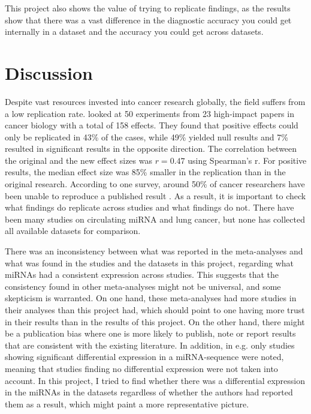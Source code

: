 This project also shows the value of trying to replicate findings, as the results show that there was a vast difference in the diagnostic accuracy you could get internally in a dataset and the accuracy you could get across datasets. 


\section{Discussion}
\label{sec:discussion}

Despite vast resources invested into cancer research globally, the field suffers from a low replication rate. \citet{cancer_replication} looked at 50 experiments from 23 high-impact papers in cancer biology with a total of 158 effects. They found that positive effects could only be replicated in 43\% of the cases, while 49\% yielded null results and 7\% resulted in significant results in the opposite direction. The correlation between the original and the new effect sizes was $r=0.47$ using Spearman's r. For positive results, the median effect size was 85\% smaller in the replication than in the original research. According to one survey, around 50\% of cancer researchers have been unable to reproduce a published result \citep{cancer_replication_survy}. As a result, it is important to check what findings do replicate across studies and what findings do not. There have been many studies on circulating miRNA and lung cancer, but none has collected all available datasets for comparison. 

There was an inconsistency between what was reported in the meta-analyses and what was found in the studies and the datasets in this project, regarding what miRNAs had a consistent expression across studies. This suggests that the consistency found in other meta-analyses might not be universal, and some skepticism is warranted. On one hand, these meta-analyses had more studies in their analyses than this project had, which should point to one having more trust in their results than in the results of this project. On the other hand, there might be a publication bias where one is more likely to publish, note or report results that are consistent with the existing literature. In addition, in e.g. \citet{mirna_replicate_sequences} only studies showing significant differential expression in a miRNA-sequence were noted, meaning that studies finding no differential expression were not taken into account. In this project, I tried to find whether there was a differential expression in the miRNAs in the datasets regardless of whether the authors had reported them as a result, which might paint a more representative picture.

